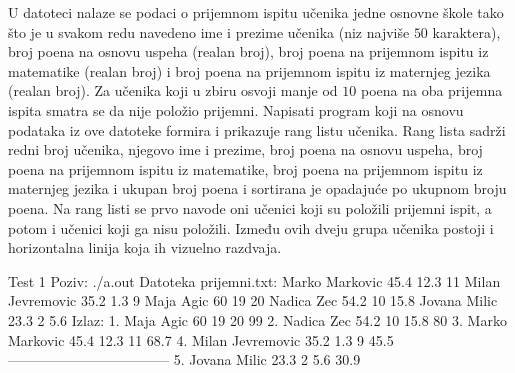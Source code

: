 \begin{Exercise}[label=705]
U datoteci  nalaze se podaci o prijemnom ispitu učenika jedne osnovne škole tako što je u svakom redu navedeno ime i prezime učenika (niz najviše $50$ karaktera), broj poena na osnovu uspeha (realan broj), broj poena na prijemnom ispitu iz matematike (realan broj) i broj poena na prijemnom ispitu iz maternjeg jezika (realan broj). Za učenika koji u zbiru osvoji manje od $10$ poena na oba prijemna ispita smatra se da nije položio prijemni. Napisati program koji na osnovu podataka iz ove datoteke formira i prikazuje rang listu učenika. Rang lista sadrži redni broj učenika, njegovo ime i prezime, broj poena na osnovu uspeha, broj poena na prijemnom ispitu iz matematike, broj poena na prijemnom ispitu iz maternjeg jezika i ukupan broj poena i sortirana je opadajuće po ukupnom broju poena. Na rang listi se prvo navode oni učenici koji su položili prijemni ispit, a potom i učenici koji ga nisu položili. Između ovih dveju grupa učenika postoji i horizontalna linija koja ih vizuelno razdvaja. 
\begin{maxitest}
\begin{test}{Test 1}
Poziv: ./a.out
Datoteka prijemni.txt:
   Marko Markovic 45.4 12.3 11         
   Milan Jevremovic 35.2 1.3 9         
   Maja Agic 60 19 20                  
   Nadica Zec 54.2 10 15.8             
   Jovana Milic 23.3 2 5.6
Izlaz:
	1. Maja Agic 60 19 20 99
	2. Nadica Zec 54.2 10 15.8 80
	3. Marko Markovic 45.4 12.3 11 68.7
	4. Milan Jevremovic 35.2 1.3 9 45.5
	-----------------------------------
	5. Jovana Milic 23.3 2 5.6 30.9
\end{test}
\end{maxitest}
\end{Exercise}
\begin{Answer}[ref=705]
\end{Answer}

